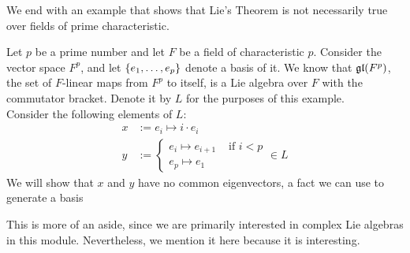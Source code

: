 \sorry

We end with an example that shows that Lie's Theorem is not necessarily true over fields of prime characteristic.

\begin{boxcexample}
    Let $p$ be a prime number and let $F$ be a field of characteristic $p$. Consider the vector space $F^p$, and let $\left\{ e_1, \ldots, e_p \right\}$ denote a basis of it. We know that $\mathfrak{gl}\!\left( F^p \right)$, the set of $F$-linear maps from $F^p$ to itself, is a Lie algebra over $F$ with the commutator bracket. Denote it by $L$ for the purposes of this example. \\

    Consider the following elements of $L$:
    \begin{align*}
        x &:= e_i \mapsto i \cdot e_{i} \\
        y &:=
        \begin{cases}
            e_i \mapsto e_{i+1} & \text{ if } i < p \\
            e_p \mapsto e_1
        \end{cases}
         \in L
    \end{align*}
    We will show that $x$ and $y$ have no common eigenvectors, a fact we can use to generate a basis 
\end{boxcexample}

This is more of an aside, since we are primarily interested in complex Lie algebras in this module. Nevertheless, we mention it here because it is interesting.
